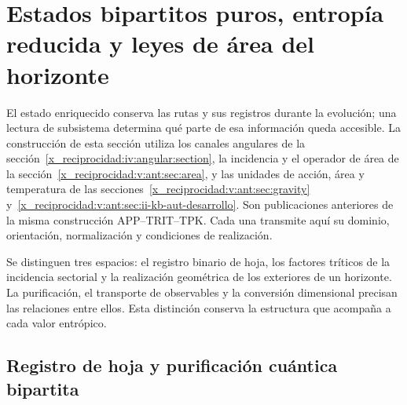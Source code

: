 


\chapter{Estados bipartitos puros, entropía reducida y leyes de área del horizonte}
\label{x_reciprocidad:vii:sec:horizontes-informacion}

El estado enriquecido conserva las rutas y sus registros durante la
evolución; una lectura de subsistema determina qué parte de esa información
queda accesible. La construcción de esta sección utiliza los canales
angulares de la sección~\ref{x_reciprocidad:iv:angular:section}, la incidencia y el
operador de área de la sección~\ref{x_reciprocidad:v:ant:sec:area}, y las unidades
de acción, área y temperatura de las
secciones~\ref{x_reciprocidad:v:ant:sec:gravity}
y~\ref{x_reciprocidad:v:ant:sec:ii-kb-aut-desarrollo}. Son publicaciones anteriores de la
misma construcción APP--TRIT--TPK. Cada una transmite aquí su dominio,
orientación, normalización y condiciones de realización.

Se distinguen tres espacios: el registro binario de hoja, los factores
tríticos de la incidencia sectorial y la realización geométrica de los
exteriores de un horizonte. La purificación, el transporte de observables
y la conversión dimensional precisan las relaciones entre ellos. Esta
distinción conserva la estructura que acompaña a cada valor entrópico.

\section{Registro de hoja y purificación cuántica bipartita}
\label{x_reciprocidad:vii:subsec:hojas-purificacion}

